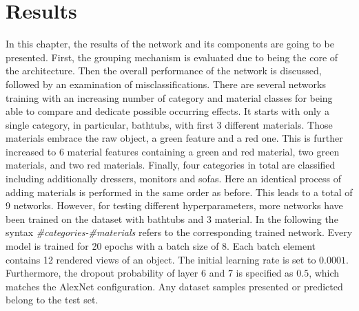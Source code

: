 \chapter{Results}
In this chapter, the results of the network and its components are going to be presented.
First, the grouping mechanism is evaluated due to being the core of the architecture.
Then the overall performance of the network is discussed, followed by an examination of misclassifications.
There are several networks training with an increasing number of category and material classes for being able to compare and dedicate possible occurring effects.
It starts with only a single category, in particular, bathtubs, with first 3 different materials.
Those materials embrace the raw object, a green feature and a red one.
This is further increased to 6 material features containing a green and red material, two green materials, and two red materials.
Finally, four categories in total are classified including additionally dressers, monitors and sofas.
Here an identical process of adding materials is performed in the same order as before.
This leads to a total of 9 networks.
However, for testing different hyperparameters, more networks have been trained on the dataset with bathtubs and 3 material.
In the following the syntax \emph{\#categories-\#materials} refers to the corresponding trained network.
Every model is trained for 20 epochs with a batch size of 8.
Each batch element contains 12 rendered views of an object.
The initial learning rate is set to $0.0001$.
Furthermore, the dropout probability of layer 6 and 7 is specified as $0.5$, which matches the AlexNet configuration.
Any dataset samples presented or predicted belong to the test set.



